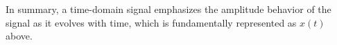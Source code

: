 In summary, a time-domain signal emphasizes the amplitude behavior of the signal as it evolves with time, which is fundamentally represented as \( x(t) \) above.

